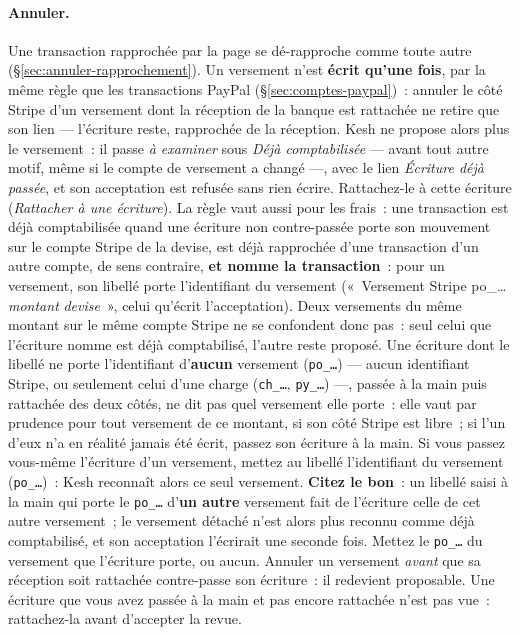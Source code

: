 \documentclass[a4paper,11pt,oneside]{article}
\begin{document}
\paragraph{Annuler.} Une transaction rapprochée par la page se dé-rapproche comme toute autre (\S\ref{sec:annuler-rapprochement}). Un versement n'est \textbf{écrit qu'une fois}, par la même règle que les transactions PayPal (\S\ref{sec:comptes-paypal})~: annuler le côté Stripe d'un versement dont la réception de la banque est rattachée ne retire que son lien --- l'écriture reste, rapprochée de la réception. Kesh ne propose alors plus le versement~: il passe \emph{à examiner} sous \emph{Déjà comptabilisée} --- avant tout autre motif, même si le compte de versement a changé ---, avec le lien \emph{Écriture déjà passée}, et son acceptation est refusée sans rien écrire. Rattachez-le à cette écriture (\emph{Rattacher à une écriture}). La règle vaut aussi pour les frais~: une transaction est déjà comptabilisée quand une écriture non contre-passée porte son mouvement sur le compte Stripe de la devise, est déjà rapprochée d'une transaction d'un autre compte, de sens contraire, \textbf{et nomme la transaction}~: pour un versement, son libellé porte l'identifiant du versement («~Versement Stripe po\_\dots{} \emph{montant} \emph{devise}~», celui qu'écrit l'acceptation). Deux versements du même montant sur le même compte Stripe ne se confondent donc pas~: seul celui que l'écriture nomme est déjà comptabilisé, l'autre reste proposé. Une écriture dont le libellé ne porte l'identifiant d'\textbf{aucun} versement (\texttt{po\_\dots}) --- aucun identifiant Stripe, ou seulement celui d'une charge (\texttt{ch\_\dots}, \texttt{py\_\dots}) ---, passée à la main puis rattachée des deux côtés, ne dit pas quel versement elle porte~: elle vaut par prudence pour tout versement de ce montant, si son côté Stripe est libre~; si l'un d'eux n'a en réalité jamais été écrit, passez son écriture à la main. Si vous passez vous-même l'écriture d'un versement, mettez au libellé l'identifiant du versement (\texttt{po\_\dots})~: Kesh reconnaît alors ce seul versement. \textbf{Citez le bon}~: un libellé saisi à la main qui porte le \texttt{po\_\dots} d'\textbf{un autre} versement fait de l'écriture celle de cet autre versement~; le versement détaché n'est alors plus reconnu comme déjà comptabilisé, et son acceptation l'écrirait une seconde fois. Mettez le \texttt{po\_\dots} du versement que l'écriture porte, ou aucun. Annuler un versement \emph{avant} que sa réception soit rattachée contre-passe son écriture~: il redevient proposable. Une écriture que vous avez passée à la main et pas encore rattachée n'est pas vue~: rattachez-la avant d'accepter la revue.
\end{document}
